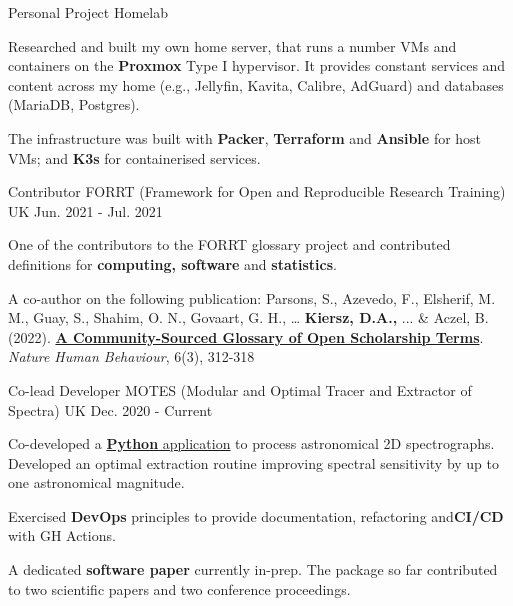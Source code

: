 
\begin{cventries}
   	
  \cventry
   	{Personal Project}
    {Homelab}
    {} %
    {} %
    {
     \begin{cvitems} 
     	\item Researched and built my own home server, that runs a number VMs and containers on the \textbf{Proxmox} Type I hypervisor. It provides constant services and content across my home (e.g., Jellyfin, Kavita, Calibre, AdGuard) and databases (MariaDB, Postgres). 
     	\item The infrastructure was built with \textbf{Packer}, \textbf{Terraform} and \textbf{Ansible} for host VMs; and \textbf{K3s} for containerised services.
     \end{cvitems}
     }
     
    \cventry
    {Contributor} %
    {FORRT (Framework for Open and Reproducible Research Training)} %
    {UK} %
    {Jun. 2021 - Jul. 2021} %
    {
      \begin{cvitems} %
		\item One of the contributors to the FORRT glossary project and contributed definitions for \textbf{computing, software} and \textbf{statistics}. 
		\item A co-author on the following publication: Parsons, S., Azevedo, F., Elsherif, M. M., Guay, S., Shahim, O. N., Govaart, G. H., … \textbf{Kiersz, D.A.,} ... \& Aczel, B. (2022). \textbf{\href{https://www.nature.com/articles/s41562-021-01269-4}{A Community-Sourced Glossary of Open Scholarship Terms}}. \textit{Nature Human Behaviour}, 6(3), 312-318
      \end{cvitems}
    }

    \cventry
    {Co-lead Developer} %
    {MOTES (Modular and Optimal Tracer and Extractor of Spectra)} %
    {UK} %
    {Dec. 2020 - Current} %
    {
      \begin{cvitems} %
        \item Co-developed a \href{https://github.com/tseccull/motes}{\textbf{Python} application} to process astronomical 2D spectrographs. Developed an optimal extraction routine improving spectral sensitivity by up to one astronomical magnitude.
        \item Exercised \textbf{DevOps} principles to provide documentation, refactoring and\textbf{CI/CD} with GH Actions.
        \item A dedicated \textbf{software paper} currently in-prep. The package so far contributed to two scientific papers and two conference proceedings.
      \end{cvitems}
    }


\end{cventries}
